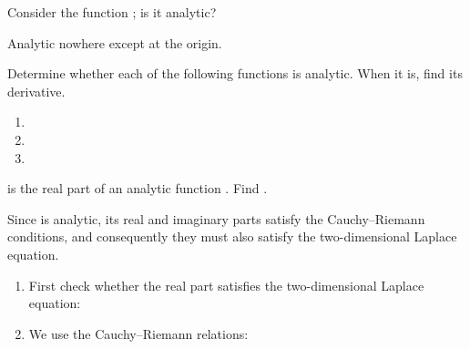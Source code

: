 \begin{EMexample}{}

Consider the function ; is it analytic?

Analytic nowhere except at the origin.

\end{EMexample}

\begin{EMexercise}{}

Determine whether each of the following functions is analytic. When it is, find its derivative.

\begin{enumerate}
\def\labelenumi{\arabic{enumi}.}
\tightlist
\item
\item
\item
\end{enumerate}

\end{EMexercise}

\EMhold


\begin{EMexample}{}

 is the real part of an analytic function . Find .

Since  is analytic, its real and imaginary parts satisfy the Cauchy--Riemann conditions, and consequently they must also satisfy the two-dimensional Laplace equation.

\begin{enumerate}
\def\labelenumi{\arabic{enumi})}
\item
  First check whether the real part satisfies the two-dimensional Laplace equation:
\item
  We use the Cauchy--Riemann relations:
\end{enumerate}

\end{EMexample}

